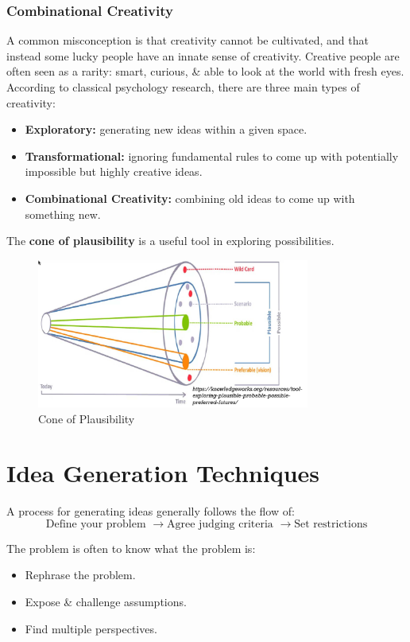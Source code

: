 \documentclass[a4paper,11pt]{article}
\begin{document}
\subsubsection{Combinational Creativity}
A common misconception is that creativity cannot be cultivated, and that instead some lucky people have an innate sense of
creativity.
Creative people are often seen as a rarity: smart, curious, \& able to look at the world with fresh eyes.
According to classical psychology research, there are three main types of creativity:
\begin{itemize}
    \item   \textbf{Exploratory:} generating new ideas within a given space.
    \item   \textbf{Transformational:} ignoring fundamental rules to come up with potentially impossible but highly creative
            ideas.
    \item   \textbf{Combinational Creativity:} combining old ideas to come up with something new.
\end{itemize}

The \textbf{cone of plausibility} is a useful tool in exploring possibilities.
\begin{figure}[H]
    \centering
    \includegraphics[width=0.8\textwidth]{images/cone.png}
    \caption{Cone of Plausibility}
\end{figure}

\section{Idea Generation Techniques}
A process for generating ideas generally follows the flow of:
$$
\text{Define your problem } \rightarrow \text{Agree judging criteria } \rightarrow \text{Set restrictions}
$$

The problem is often to know what the problem is:
\begin{itemize}
    \item   Rephrase the problem.
    \item   Expose \& challenge assumptions.
    \item   Find multiple perspectives.
\end{itemize}
\end{document}
